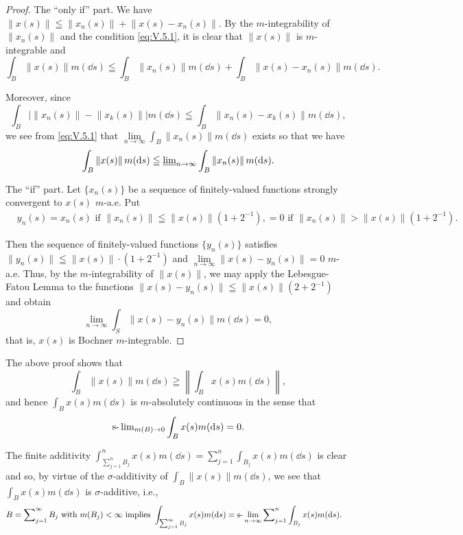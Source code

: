 \begin{proof}
 The ``only if'' part. We have $\left\|x(s)\right\| \leqq \left\|x_{n}(s)\right\| + \left\|x(s) - x_{n}(s)\right\|$. By the $m$-integrability of $\left\|x_{n}(s)\right\|$ and the condition \eqref{eq:V.5.1}, it is clear that $\left\|x(s)\right\|$ is $m$-integrable and 
\[
\int_{B} \| x (s) \| m (\dd s) \leqq \int_{B} \| x _{n} (s) \| m (\dd s) + \int_{B} \| x (s) - x _{n} (s) \| m (\dd s). \]

Moreover, since 
\[
\int_{B} \left| \left\| x _{n} (s) \right\| - \left\| x _{k} (s) \right\| \right| m (\dd s) \leqq \int_{B} \left\| x _{n} (s) - x _{k} (s) \right\| m (\dd s),
\]
we see from \eqref{eq:V.5.1} that $\lim\limits_{n\to \infty}\int_{B}\|x_n(s)\|m(\dd s)$ exists so that we have 
\[
\int_{B} \left\| x (s) \right\| m (\mathop{}\!\mathrm{d} s) \leqq \varliminf\nolimits_{n \rightarrow \infty} \int_{B} \left\| x _{n} (s) \right\| m (\mathop{}\!\mathrm{d} s).
\]

The ``if'' part. Let $\{x_{n}(s)\}$ be a sequence of finitely-valued functions strongly convergent to $x(s)$ $m$-a.e. Put 
\[
\begin{aligned}
&y _{n} (s) = x _{n} (s)  \text{ if } \| x _{n} (s) \| \leqq \| x (s) \| (1 + 2 ^{-1}), = 0  \text{ if } \| x _{n} (s) \| > \| x (s) \| (1 + 2 ^{-1}).
\end{aligned}
\]

Then the sequence of finitely-valued functions $\{y_n(s)\}$ satisfies $\|y_n(s)\| \leqq \|x(s)\| \cdot (1 + 2^{-1})$ and $\lim\limits_{n \to \infty} \|x(s) - y_n(s)\| = 0$ $m$-a.e. Thus, by the $m$-integrability of $\|x(s)\|$, we may apply the Lebesgue-Fatou Lemma to the functions $\|x(s) - y_n(s)\| \leqq \|x(s)\| (2 + 2^{-1})$ and obtain 
\[
\lim\limits _{n \rightarrow \infty} \int_{S} \| x (s) - y _{n} (s) \| m (\dd s) = 0,
\]
that is, $x(s)$ is Bochner $m$-integrable. 
\end{proof}
\begin{corollary}\label{cor:V.5.Corollary.1} The above proof shows that 
\[
\int_{B} \left\| x (s) \right\| m (\dd s) \geqq \left\| \int_{B} x (s) m (\dd s) \right\|,
\]
and hence $\int_{B} x(s) m(\dd s)$ is $m$-absolutely continuous in the sense that 
\[
\underset {m (B) \rightarrow 0} {\slim} \int_{B} x (s) m (\dd s) = 0.
\]
\end{corollary}

The finite additivity $\int_{\sum\limits_{j=1}^{n} B_j}^n x(s) m(\dd s) = \sum\limits_{j=1}^{n} \int_{B_{j}} x(s) m(\dd s)$ is clear and 
so, by virtue of the $\sigma$-additivity of $\int_{B} \| x(s) \| m(\dd s)$, we see that $\int_{B} x(s) m(\dd s)$ is $\sigma$-additive, i.e., 
\[
\begin{aligned}
&B = \sum\nolimits_{j=1} ^{\infty} B _{j} \text{ with } m (B _{j}) < \infty \text{ implies } \int_ {\sum\nolimits_{j=1} ^{\infty} B _{j}} x (s) m (\mathop{}\!\mathrm{d} s) = \text{s-}\lim _{n \to \infty} \sum\nolimits_{j=1} ^{n} \int_ {B _{j}} x (s) m (\mathop{}\!\mathrm{d} s).
\end{aligned}
\]

